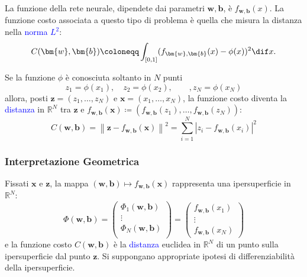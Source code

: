 \documentclass[10pt]{book}
\newcommand{\1}{\mathds{1}}
\newcommand{\R}{\mathds{R}}
\newcommand{\norma}[1]{%
\left\lVert#1\right\rVert%
}
\theoremstyle{definition}%
\theoremstyle{plain}
\theoremstyle{remark}
\renewcommand{\href}[2]{\textcolor{blue}{#2}}
\begin{document}
La funzione della rete neurale, dipendete dai parametri \(\bm{w},\bm{b}\), è \(f_{\bm{w},\bm{b}}(x)\). La funzione costo associata a questo tipo di problema è quella che misura la distanza nella \href{../../../../../org/roam/20250625123506-spazio_normato.org}{norma} \href{../../../../../org/roam/20250624162220-spazi_lp.org}{\(L^{2}\)}:
\begin{equation*}
C(\bm{w},\bm{b}) \coloneqq \int_{[0,1]} (f_{\bm{w},\bm{b}}(x)-\phi(x))^{2}\dif x.
\end{equation*}


Se la funzione \(\phi\) è conosciuta soltanto in \(N\) punti
\begin{equation*}
z_{1}=\phi(x_{1}),\quad z_{2}=\phi(x_{2}),\qquad, z_{N} = \phi(x_{N})
\end{equation*}
allora, posti \(\bm{z}=(z_{1},\dots,z_{N})\) e \(\bm{x} = (x_{1},\dots,x_{N})\), la funzione costo diventa la \href{../../../../../org/roam/20250301193511-spazio_metrico.org}{distanza} in \(\R^{N}\) tra \(\bm{z}\) e \(f_{\bm{w},\bm{b}}(\bm{x}) \coloneqq \left(f_{\bm{w},\bm{b}}(z_{1}),\dots,f_{\bm{w},\bm{b}}(z_{N})\right)\):
\begin{equation*}
C(\bm{w},\bm{b}) = \norma{\bm{z}-f_{\bm{w},\bm{b}}(\bm{x})}^{2} = \sum_{i=1}^{N} |z_{i}-f_{\bm{w},\bm{b}}(x_{i})|^{2}
\end{equation*}
\subsubsection{Interpretazione Geometrica}
\label{sec:org6d453e6}

Fissati \(\bm{x}\) e \(\bm{z}\), la mappa \((\bm{w},\bm{b})\mapsto f_{\bm{w},\bm{b}}(\bm{x})\) rappresenta una ipersuperficie in \(\R^{N}\):
\begin{equation*}
\Phi(\bm{w},\bm{b}) = \begin{pmatrix}
\Phi_{1}(\bm{w},\bm{b})\\
\vdots\\
\Phi_{N}(\bm{w},\bm{b})\\
\end{pmatrix} = \begin{pmatrix}
f_{\bm{w},\bm{b}}(x_{1})\\
\vdots\\
f_{\bm{w},\bm{b}}(x_{N})
\end{pmatrix}
\end{equation*}
e la funzione costo \(C(\bm{w},\bm{b})\) è la \href{../../../../../org/roam/20250301193511-spazio_metrico.org}{distanza} euclidea in \(\R^{N}\) di un punto sulla ipersuperficie dal punto \(\bm{z}\). Si suppongano appropriate ipotesi di differenziabilità della ipersuperficie.
\end{document}
